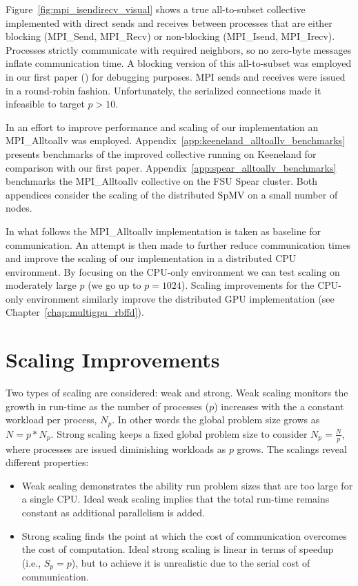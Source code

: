 \documentclass{report}
\begin{document}
Figure~\ref{fig:mpi_isendirecv_visual} shows a true all-to-subset collective implemented with direct sends and receives between processes that are either blocking (MPI\_Send, MPI\_Recv) or non-blocking (MPI\_Isend, MPI\_Irecv). Processes strictly communicate with required neighbors, so no zero-byte messages inflate communication time. 
A blocking version of this all-to-subset was employed in our first paper (\cite{BolligFlyerErlebacher2012}) for debugging purposes. MPI sends and receives were issued in a round-robin fashion. Unfortunately, the serialized connections made it infeasible to target $p > 10$. 

In an effort to improve performance and scaling of our implementation an MPI\_Alltoallv was employed. Appendix~\ref{app:keeneland_alltoallv_benchmarks} presents benchmarks of the improved collective running on Keeneland for comparison with our first paper. Appendix~\ref{app:spear_alltoallv_benchmarks} benchmarks the MPI\_Alltoallv collective on the FSU Spear cluster. Both appendices consider the scaling of the distributed SpMV on a small number of nodes.  

In what follows the MPI\_Alltoallv implementation is taken as baseline for communication. An attempt is then made to further reduce communication times and improve the scaling of our implementation in a distributed CPU environment. By focusing on the CPU-only environment we can test scaling on moderately large $p$ (we go up to $p = 1024$). Scaling improvements for the CPU-only environment similarly improve the distributed GPU implementation (see Chapter~\ref{chap:multigpu_rbffd}). 

\section{Scaling Improvements} 
\label{sec:cpu_scaling}


Two types of scaling are considered: weak and strong. Weak scaling monitors the growth in run-time as the number of processes ($p$) increases with the a constant workload per process, $N_p$. In other words the global problem size grows as $N = p*N_p$. Strong scaling keeps a fixed global problem size to consider $N_p = \frac{N}{p}$, where processes are issued diminishing workloads as $p$ grows. 
The scalings reveal different properties:
\begin{itemize} 
\item Weak scaling demonstrates the ability run problem sizes that are too large for a single CPU. Ideal weak scaling implies that the total run-time remains constant as additional parallelism is added. %
\item Strong scaling finds the point at which the cost of communication overcomes the cost of computation. Ideal strong scaling is linear in terms of speedup (i.e., $S_p = p$), but to achieve it is unrealistic due to the serial cost of communication. 
\end{itemize}
 
\end{document}
